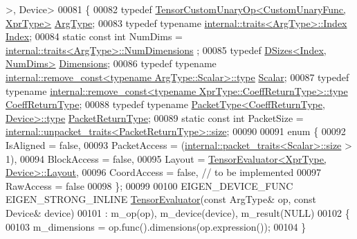 \begin{DoxyCode}
      >, Device>
00081 \{
00082   \textcolor{keyword}{typedef} \hyperlink{class_eigen_1_1_tensor_custom_unary_op}{TensorCustomUnaryOp<CustomUnaryFunc, XprType>} 
      \hyperlink{class_eigen_1_1_tensor_custom_unary_op}{ArgType};
00083   \textcolor{keyword}{typedef} \textcolor{keyword}{typename} \hyperlink{struct_eigen_1_1internal_1_1traits}{internal::traits<ArgType>::Index} 
      \hyperlink{namespace_eigen_a62e77e0933482dafde8fe197d9a2cfde}{Index};
00084   \textcolor{keyword}{static} \textcolor{keyword}{const} \textcolor{keywordtype}{int} NumDims = \hyperlink{struct_eigen_1_1internal_1_1traits}{internal::traits<ArgType>::NumDimensions}
      ;
00085   \textcolor{keyword}{typedef} \hyperlink{struct_eigen_1_1_d_sizes}{DSizes<Index, NumDims>} \hyperlink{struct_eigen_1_1_d_sizes}{Dimensions};
00086   \textcolor{keyword}{typedef} \textcolor{keyword}{typename} \hyperlink{group___sparse_core___module}{internal::remove\_const<typename ArgType::Scalar>::type}
       \hyperlink{group___sparse_core___module}{Scalar};
00087   \textcolor{keyword}{typedef} \textcolor{keyword}{typename} 
      \hyperlink{group___sparse_core___module}{internal::remove\_const<typename XprType::CoeffReturnType>::type}
       \hyperlink{group___sparse_core___module}{CoeffReturnType};
00088   \textcolor{keyword}{typedef} \textcolor{keyword}{typename} \hyperlink{group___sparse_core___module}{PacketType<CoeffReturnType, Device>::type} 
      \hyperlink{group___sparse_core___module}{PacketReturnType};
00089   \textcolor{keyword}{static} \textcolor{keyword}{const} \textcolor{keywordtype}{int} PacketSize = 
      \hyperlink{struct_eigen_1_1internal_1_1unpacket__traits}{internal::unpacket\_traits<PacketReturnType>::size};
00090 
00091   \textcolor{keyword}{enum} \{
00092     IsAligned = \textcolor{keyword}{false},
00093     PacketAccess = (\hyperlink{struct_eigen_1_1internal_1_1packet__traits}{internal::packet\_traits<Scalar>::size} > 1),
00094     BlockAccess = \textcolor{keyword}{false},
00095     Layout = \hyperlink{struct_eigen_1_1_tensor_evaluator}{TensorEvaluator<XprType, Device>::Layout},
00096     CoordAccess = \textcolor{keyword}{false},  \textcolor{comment}{// to be implemented}
00097     RawAccess = \textcolor{keyword}{false}
00098   \};
00099 
00100   EIGEN\_DEVICE\_FUNC EIGEN\_STRONG\_INLINE \hyperlink{struct_eigen_1_1_tensor_evaluator}{TensorEvaluator}(\textcolor{keyword}{const} ArgType& op, \textcolor{keyword}{const} Device& 
      device)
00101       : m\_op(op), m\_device(device), m\_result(NULL)
00102   \{
00103     m\_dimensions = op.func().dimensions(op.expression());
00104   \}

\end{DoxyCode}
